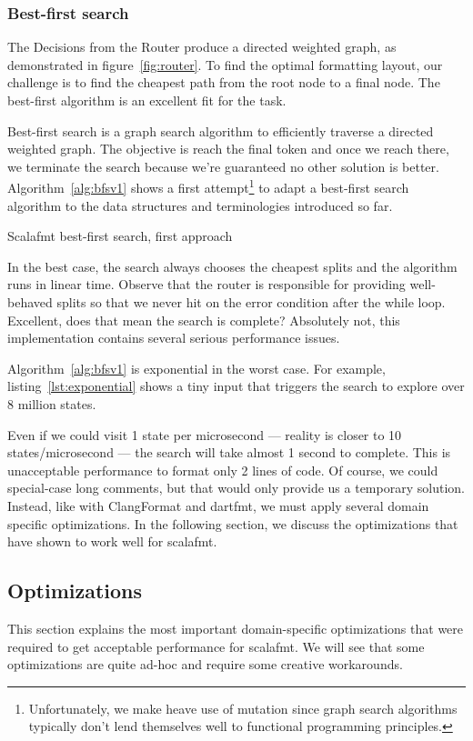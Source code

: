 \subsubsection{Best-first search}
The Decisions from the Router produce a directed weighted graph, as demonstrated in figure~\ref{fig:router}.
To find the optimal formatting layout, our challenge is to find the cheapest path from the root node to a final node.
The best-first\autocite{pearl_heuristics:_1984} algorithm is an excellent fit for the task.

Best-first search is a graph search algorithm to efficiently traverse a directed weighted graph.
The objective is reach the final token and once we reach there, we terminate the search because we're guaranteed no other solution is better.
Algorithm~\ref{alg:bfsv1} shows a first attempt\footnote{
  Unfortunately, we make heave use of mutation since graph search algorithms typically don't lend themselves well to functional programming principles.
} to adapt a best-first search algorithm to the data structures and terminologies introduced so far.
\begin{algorithm}
  \caption{Scalafmt best-first search, first approach}\label{alg:bfsv1}
  
\end{algorithm}
In the best case, the search always chooses the cheapest splits and the algorithm runs in linear time.
Observe that the router is responsible for providing well-behaved splits so that we never hit on the error condition after the while loop.
Excellent, does that mean the search is complete?
Absolutely not, this implementation contains several serious performance issues.

Algorithm~\ref{alg:bfsv1} is exponential in the worst case.
For example, listing~\ref{lst:exponential} shows a tiny input that triggers the search to explore over 8 million states.

Even if we could visit 1 state per microsecond --- reality is closer to 10 states/microsecond ---  the search will take almost 1 second to complete.
This is unacceptable performance to format only 2 lines of code.
Of course, we could special-case long comments, but that would only provide us a temporary solution.
Instead, like with ClangFormat and dartfmt, we must apply several domain specific optimizations.
In the following section, we discuss the optimizations that have shown to work well for scalafmt.

\subsection{Optimizations}
This section explains the most important domain-specific optimizations that were required to get acceptable performance for scalafmt.
We will see that some optimizations are quite ad-hoc and require some creative workarounds.

